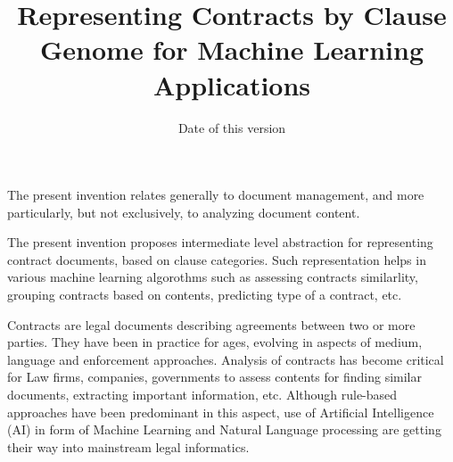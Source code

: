 \documentclass[english]{uspatent}
\begin{document}
\setPrintingModeApplication



\title{Representing Contracts by Clause Genome for Machine Learning Applications}
\date{Date of this version}

\maketitle


\patentParagraph The present invention relates generally to document management, and more particularly, but not exclusively, to analyzing document content.

\patentParagraph The present invention proposes intermediate level abstraction for representing contract documents, based on clause categories. Such representation helps in various machine learning algorothms such as assessing contracts similarlity, grouping contracts based on contents, predicting type of a contract, etc.


\patentParagraph Contracts are legal documents describing agreements between two or more parties. They have been in practice for ages, evolving in aspects of medium, language and enforcement approaches. Analysis of contracts has become critical for Law firms, companies, governments to assess contents for finding similar documents, extracting important information, etc. Although rule-based approaches have been predominant in this aspect, use of Artificial Intelligence (AI) in form of Machine Learning and Natural Language processing are getting their way into mainstream legal informatics.
\end{document}

